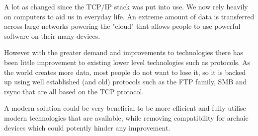 A lot as changed since the TCP/IP stack was put into use. We now rely heavily on computers to aid us in everyday life. An extreme amount of data is transferred across large networks powering the "cloud" that allows people to use powerful software on their many devices.

However with the greater demand and improvements to technologies there has been little improvement to existing lower level technologies such as protocols. As the world creates more data, most people do not want to lose it, so it is backed up using well established (and old) protocols such as the FTP family, SMB and rsync that are all based on the TCP protocol.

A modern solution could be very beneficial to be more efficient and fully utilise modern technologies that are available, while removing compatibility for archaic devices which could potently hinder any improvement.
